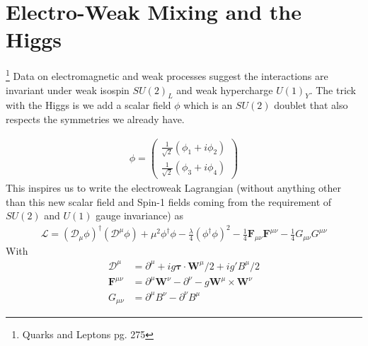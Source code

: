 \section{Electro-Weak Mixing and the Higgs}
\footnote{Quarks and Leptons pg. 275}
Data on electromagnetic and weak processes suggest the interactions are invariant under weak isospin $SU(2)_L$ and weak hypercharge $U(1)_Y$. The trick with the Higgs is we add a scalar field $\phi$ which is an $SU(2)$ doublet that also respects the symmetries we already have.

\begin{align}
\phi = \begin{pmatrix}
\frac{1}{\sqrt{2}}(\phi_1+i\phi_2)\\
\frac{1}{\sqrt{2}}(\phi_3 +i\phi_4)
\end{pmatrix}
\end{align}
This inspires us to write the electroweak Lagrangian (without anything other than this new scalar field and Spin-1 fields coming from the requirement of $SU(2)$ and $U(1)$ gauge invariance) as
\begin{align}
\mathcal{L} = (\mathcal{D}_\mu\phi)^\dagger(\mathcal{D}^\mu\phi) + \mu^2\phi^\dagger\phi- \frac{\lambda}{4}(\phi^\dagger\phi)^2 -\frac{1}{4}\textbf{F}_{\mu\nu}\textbf{F}^{\mu\nu} - \frac{1}{4}G_{\mu\nu}G^{\mu\nu}
\end{align}
With 
\begin{align}
\mathcal{D}^\mu &= \partial^\mu + ig\boldsymbol{\tau}\cdot\textbf{W}^\mu/2 + ig'B^\mu/2\\
\textbf{F}^{\mu\nu} &= \partial^\mu\textbf{W}^\nu - \partial^\nu - g\textbf{W}^\mu\times\textbf{W}^\nu\\
G_{\mu\nu} &= \partial^\mu B^\nu - \partial^\nu B^\mu
\end{align}

